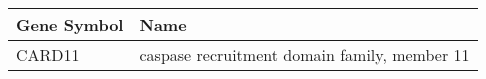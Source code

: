 \begin{tabular}{ll}
\toprule
Gene Symbol &                                         Name \\
\midrule
     CARD11 & caspase recruitment domain family, member 11 \\
\bottomrule
\end{tabular}
